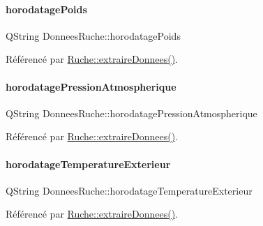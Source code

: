 \mbox{\label{struct_donnees_ruche_a8f96978c53a79f3c4b450240c67a306d}} 
\paragraph{\texorpdfstring{horodatage\+Poids}{horodatagePoids}}
{\footnotesize\ttfamily Q\+String Donnees\+Ruche\+::horodatage\+Poids}



Référencé par \hyperlink{class_ruche_a21c0dafeaec03d451590037343e6a3ca}{Ruche\+::extraire\+Donnees()}.

\mbox{\label{struct_donnees_ruche_a21b7eeed18bc28b9c0f19f1ed5da7916}} 
\paragraph{\texorpdfstring{horodatage\+Pression\+Atmospherique}{horodatagePressionAtmospherique}}
{\footnotesize\ttfamily Q\+String Donnees\+Ruche\+::horodatage\+Pression\+Atmospherique}



Référencé par \hyperlink{class_ruche_a21c0dafeaec03d451590037343e6a3ca}{Ruche\+::extraire\+Donnees()}.

\mbox{\label{struct_donnees_ruche_a91fb0ab596625f4c63fed764dc649dfb}} 
\paragraph{\texorpdfstring{horodatage\+Temperature\+Exterieur}{horodatageTemperatureExterieur}}
{\footnotesize\ttfamily Q\+String Donnees\+Ruche\+::horodatage\+Temperature\+Exterieur}



Référencé par \hyperlink{class_ruche_a21c0dafeaec03d451590037343e6a3ca}{Ruche\+::extraire\+Donnees()}.

